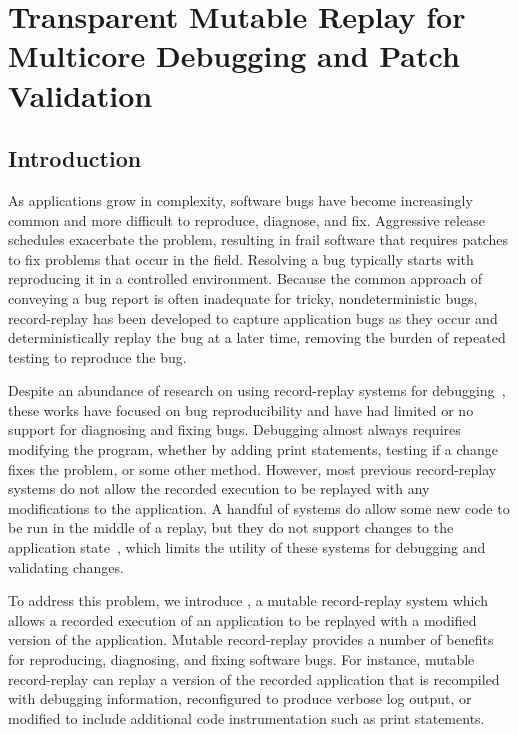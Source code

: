\chapter{Transparent Mutable Replay for Multicore Debugging and Patch Validation}
\label{ch:dora}

\section{Introduction}

As applications grow in complexity, software bugs have become
increasingly common and more difficult to reproduce, diagnose, and fix.
Aggressive release schedules
exacerbate the problem, resulting in frail software that requires patches to
fix problems that occur in the field. Resolving a bug typically starts with
reproducing it in a controlled environment. Because the common approach of conveying a bug
report is often inadequate for tricky, nondeterministic bugs, record-replay has been developed to
capture application bugs as they occur and
deterministically replay the bug at a later time, removing the burden of
repeated testing to reproduce the bug.

Despite an abundance of research on using record-replay systems for 
debugging~\cite{idna:vee06,instant-replay,r2:osdi,odr:sosp09,pinsel:pldi07,pres:sosp09,jockey,srinivasan:flashback,subhraveti:sigmetrics11}, these works have
focused on bug reproducibility and have had limited or no support for diagnosing
and fixing bugs.
Debugging almost always requires modifying the program, whether by
adding print statements, testing if a change fixes the problem, or
some other method.
However, most previous record-replay systems do not allow the recorded execution
to be replayed with any modifications to the application.
A handful of systems do allow some new code to be run in the middle of a replay,
but they do not support changes to the application
state~\cite{intrusions:sosp05,decouple:usenix08},
which limits the utility of these systems for debugging and validating changes.

To address this problem, we introduce {\dora}, a mutable
record-replay system which allows a recorded execution of an
application to be replayed with a modified version
of the application. Mutable record-replay provides a
number of benefits for reproducing, diagnosing, and fixing software
bugs. For instance, mutable record-replay can replay a version
of the recorded application that is recompiled with debugging information,
reconfigured to produce verbose log output, or modified to include additional
code instrumentation such as print statements.

